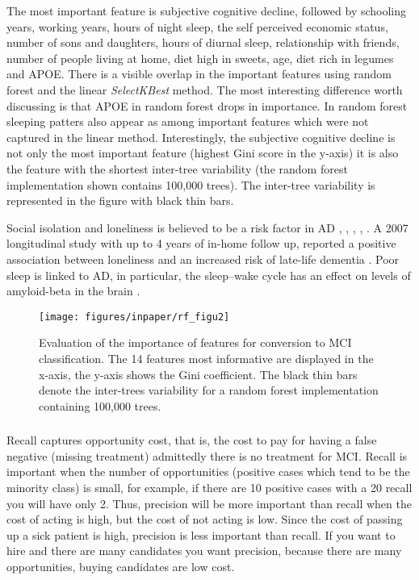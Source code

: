 \documentclass[preprint,12pt]{elsarticle}
\begin{document}
The most important feature is subjective cognitive decline, followed by schooling years, working years, hours of night sleep, the self perceived economic status, number of sons and daughters, hours of diurnal sleep, relationship with friends, number of people living at home, diet high in sweets, age, diet rich in legumes and APOE.
There is a visible overlap in the important features using random forest and the linear \emph{SelectKBest} method. The most interesting difference worth discussing is that APOE in random forest drops in importance. In random forest sleeping patters also appear as among important features which were not captured in the linear method. 
Interestingly, the subjective cognitive decline is not only the most important feature (highest Gini score in the y-axis) it is also the feature with the shortest inter-tree variability (the random forest implementation shown contains 100,000 trees). The inter-tree variability is represented in the figure with black thin bars. 

Social isolation and loneliness is believed to be a risk factor in AD \cite{holmen1992loneliness}, \cite{fratiglioni2000influence}, \cite{shankar2013social}, \cite{holwerda2014feelings}, \cite{evans2018social}. A 2007 longitudinal study with up to 4 years of in-home follow up, reported a positive association between loneliness and an increased risk of late-life dementia \cite{wilson2007loneliness}. Poor sleep is linked to AD, in particular, the sleep–wake cycle has an effect on levels of amyloid-beta in the brain \cite{ju2014sleep}.

\begin{figure}[!htb]
        \centering
        \texttt{[image: figures/inpaper/rf\_figu2]}
        \caption{Evaluation of the importance of features for conversion to MCI classification.  The 14 features most informative are displayed in the x-axis, the y-axis shows the Gini coefficient. The black thin bars denote the inter-trees variability for a random forest implementation containing  100,000 trees.} 
        \label{fig:RF_selectorgini}
\end{figure}

\subsubsection{}
Recall captures opportunity cost, that is, the cost to pay for having a false negative (missing treatment) admittedly there is no treatment for MCI. Recall is important when the number of opportunities (positive cases which tend to be the minority class) is small, for example, if there are 10 positive cases with a 20 recall you will have only 2.
Thus, precision will be more important than recall when the cost of acting is high, but the cost of not acting is low.  Since the cost of passing up a sick patient is high, precision is less important than recall. If you want to hire and there are many candidates you want precision, because there are many opportunities, buying candidates are low cost.
\end{document}
